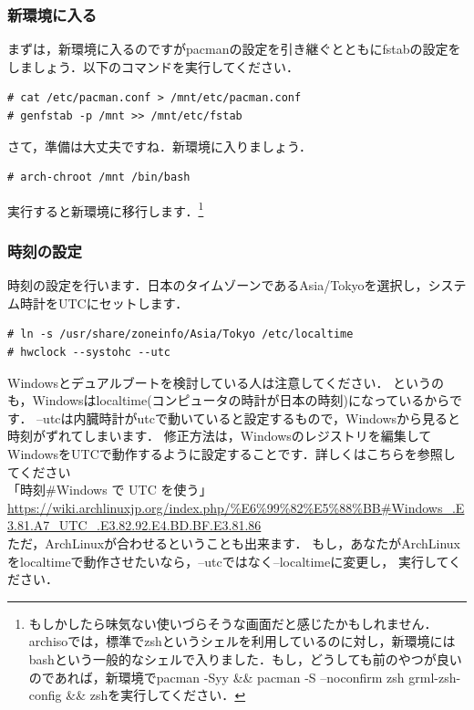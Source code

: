 \documentclass[b5j,twoside,openany]{jsbook}
\begin{document}
      \subsubsection{新環境に入る}
        まずは，新環境に入るのですがpacmanの設定を引き継ぐとともにfstabの設定をしましょう．以下のコマンドを実行してください．
        \begin{screen}
\begin{verbatim}
# cat /etc/pacman.conf > /mnt/etc/pacman.conf
# genfstab -p /mnt >> /mnt/etc/fstab
\end{verbatim}
        \end{screen}
        さて，準備は大丈夫ですね．新環境に入りましょう．
        \begin{screen}
\begin{verbatim}
# arch-chroot /mnt /bin/bash
\end{verbatim}
        \end{screen}
        実行すると新環境に移行します．\footnote{もしかしたら味気ない使いづらそうな画面だと感じたかもしれません．archisoでは，標準でzshというシェルを利用しているのに対し，新環境にはbashという一般的なシェルで入りました．もし，どうしても前のやつが良いのであれば，新環境でpacman -Syy \&\& pacman -S --noconfirm zsh grml-zsh-config \&\& zshを実行してください．}
        
      \subsubsection{時刻の設定}
        時刻の設定を行います．日本のタイムゾーンであるAsia/Tokyoを選択し，システム時計をUTCにセットします．
        \begin{screen}
\begin{verbatim}
# ln -s /usr/share/zoneinfo/Asia/Tokyo /etc/localtime
# hwclock --systohc --utc
\end{verbatim}
        \end{screen}
        \begin{boxnote}
          Windowsとデュアルブートを検討している人は注意してください．
          というのも，Windowsはlocaltime(コンピュータの時計が日本の時刻)になっているからです．
          --utcは内臓時計がutcで動いていると設定するもので，Windowsから見ると時刻がずれてしまいます．
          修正方法は，Windowsのレジストリを編集してWindowsをUTCで動作するように設定することです．詳しくはこちらを参照してください\\

          「時刻\#Windows で UTC を使う」\\
          \url{https://wiki.archlinuxjp.org/index.php/%E6%99%82%E5%88%BB#Windows_.E3.81.A7_UTC_.E3.82.92.E4.BD.BF.E3.81.86}\\

          ただ，ArchLinuxが合わせるということも出来ます．
          もし，あなたがArchLinuxをlocaltimeで動作させたいなら，--utcではなく--localtimeに変更し，
          実行してください．
        \end{boxnote}
\end{document}
